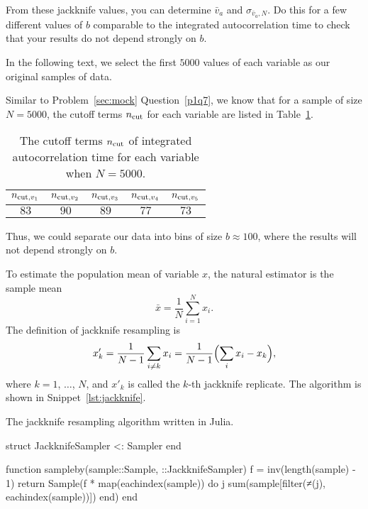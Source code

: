 From these jackknife values, you can determine \(\bar{v}_a\) and \(\sigma_{\bar{v}_a,N}\).
Do this for a few different values of \(b\) comparable to the integrated autocorrelation
time to check that your results do not depend strongly on \(b\).

\Answer{}
In the following text, we select the first \(5000\) values of each variable as our original
samples of data.

Similar to Problem~\ref{sec:mock} Question~\ref{p1q7}, we know that for a sample of
size \(N=5000\), the cutoff terms \(n_\textnormal{cut}\) for each variable are listed in
Table~\ref{tab:JA_ncut}.
%
\begin{table}
    \centering
    \caption{The cutoff terms \(n_\textnormal{cut}\) of integrated autocorrelation
        time for each variable when \(N = 5000\).}
    \label{tab:JA_ncut}
    \begin{tabular}{@{}ccccc@{}}
        \toprule
        \(n_{\textnormal{cut},v_1}\) & \(n_{\textnormal{cut},v_2}\) & \(n_{\textnormal{cut},v_3}\) & \(n_{\textnormal{cut},v_4}\) & \(n_{\textnormal{cut},v_5}\) \\
        \midrule
        \(83\)                       & \(90\)                       & \(89\)                       & \(77\)                       & \(73\)                       \\
        \bottomrule
    \end{tabular}
\end{table}
%
Thus, we could separate our data into bins of size \(b \approx 100\), where the results
will not depend strongly on \(b\).

To estimate the population mean of variable \(x\),
the natural estimator is the sample mean
%
\begin{equation}
    \bar{x} = \frac{ 1 }{ N } \sum_{i=1}^N x_i.
\end{equation}
%
The definition of jackknife resampling is
%
\begin{equation}
    x_k' = \frac{1}{N - 1}
    \sum_{i \neq k} x_i = \frac{ 1 }{ N - 1 } \Bigl(\sum_i x_i - x_k \Bigr),
\end{equation}
%
where \(k = 1\), \(\ldots\), \(N\), and \(x'_k\) is called the \(k\)-th jackknife replicate.
The algorithm is shown in Snippet~\ref{lst:jackknife}.
%
\begin{algorithm}
    \caption{The jackknife resampling algorithm written in Julia.}
    \label{lst:jackknife}
    \begin{juliacode}
        struct JackknifeSampler <: Sampler end

        function sampleby(sample::Sample, ::JackknifeSampler)
            f = inv(length(sample) - 1)
            return Sample(f * map(eachindex(sample)) do j
                sum(sample[filter(≠(j), eachindex(sample))])
            end)
        end
    \end{juliacode}
\end{algorithm}

